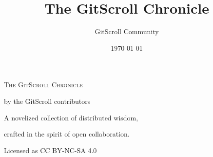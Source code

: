\documentclass[11pt,openright,twoside]{book}
\title{The GitScroll Chronicle}
\author{GitScroll Community}
\date{\today}
\begin{document}
\frontmatter
\begin{titlepage}
  \centering
  \vspace*{1.7in}
  {\Huge\scshape The GitScroll Chronicle\par}
  \vspace{0.45in}
  {\Large by the GitScroll contributors\par}
  \vfill
  {\large A novelized collection of distributed wisdom,\par}
  {\large crafted in the spirit of open collaboration.\par}
  \vspace{0.6in}
  {\large Licensed as CC BY-NC-SA 4.0\par}
\end{titlepage}

\cleardoublepage

\cleardoublepage

\tableofcontents
\mainmatter


\end{document}
